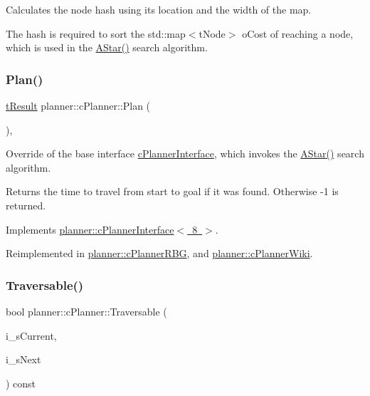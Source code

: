 Calculates the node hash using its location and the width of the map. 

The hash is required to sort the std\+::map$<$t\+Node$>$ o\+Cost of reaching a node, which is used in the \mbox{\hyperlink{classplanner_1_1c_planner_a341e70531266f023ac9461d18979d1ef}{A\+Star()}} search algorithm. \mbox{\label{classplanner_1_1c_planner_a21230c015260b9fc34ad2f239592470e}} 
\subsubsection{\texorpdfstring{Plan()}{Plan()}}
{\footnotesize\ttfamily \mbox{\hyperlink{structt_result}{t\+Result}} planner\+::c\+Planner\+::\+Plan (\begin{DoxyParamCaption}{ }\end{DoxyParamCaption})\hspace{0.3cm}{\ttfamily [override]}, {\ttfamily [virtual]}}



Override of the base interface \mbox{\hyperlink{classplanner_1_1c_planner_interface}{c\+Planner\+Interface}}, which invokes the \mbox{\hyperlink{classplanner_1_1c_planner_a341e70531266f023ac9461d18979d1ef}{A\+Star()}} search algorithm. 

\begin{DoxyReturn}{Returns}
the time to travel from start to goal if it was found. Otherwise -\/1 is returned. 
\end{DoxyReturn}


Implements \mbox{\hyperlink{classplanner_1_1c_planner_interface_a7a06632a8c53906daf39611d9692ffa5}{planner\+::c\+Planner\+Interface$<$ 8 $>$}}.



Reimplemented in \mbox{\hyperlink{classplanner_1_1c_planner_r_b_g_a0bbd752702da582a47dbd153c0065eb5}{planner\+::c\+Planner\+R\+BG}}, and \mbox{\hyperlink{classplanner_1_1c_planner_wiki_a9d18be721400b51162ff463ab11d1721}{planner\+::c\+Planner\+Wiki}}.

\mbox{\label{classplanner_1_1c_planner_ab17c52bf6dd433b8f392a5bf2bc4b9a1}} 
\subsubsection{\texorpdfstring{Traversable()}{Traversable()}}
{\footnotesize\ttfamily bool planner\+::c\+Planner\+::\+Traversable (\begin{DoxyParamCaption}\item[{std\+::shared\+\_\+ptr$<$ \mbox{\hyperlink{structplanner_1_1t_node}{t\+Node}} $>$}]{i\+\_\+s\+Current,  }\item[{std\+::shared\+\_\+ptr$<$ \mbox{\hyperlink{structplanner_1_1t_node}{t\+Node}} $>$}]{i\+\_\+s\+Next }\end{DoxyParamCaption}) const}



